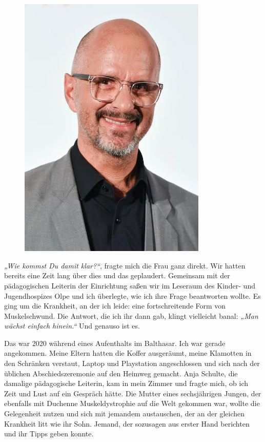 \documentclass[fontsize=14pt,a4paper,headinclude,DIV=calc,automark]{scrbook}
\begin{document}
\begin{figure}[ht] %
    \centering %
    \includegraphics[width=0.8\textwidth]{Fotos/ChristophMariaHerbst.jpg}
    \label{fig:ChristophMariaHerbst} %
\end{figure}

\vspace{-1\baselineskip}

\textit{„Wie kommst Du damit klar?“}, fragte mich die Frau ganz direkt. Wir hatten bereits eine Zeit lang über dies und das geplaudert. Gemeinsam mit der pädagogischen Leiterin der Einrichtung saßen wir im Leseraum des Kinder- und Jugendhospizes Olpe und ich überlegte, wie ich ihre Frage beantworten wollte. Es ging um die Krankheit, an der ich leide: eine fortschreitende Form von Muskelschwund. Die Antwort, die ich ihr dann gab, klingt vielleicht banal: \textit{„Man wächst einfach hinein.“} Und genauso ist es.

Das war 2020 während eines Aufenthalts im Balthasar. Ich war gerade angekommen. Meine Eltern hatten die Koffer ausgeräumt, meine Klamotten in den Schränken verstaut, Laptop und Playstation angeschlossen und sich nach der üblichen Abschiedszeremonie auf den Heimweg gemacht. Anja Schulte, die damalige pädagogische Leiterin, kam in mein Zimmer und fragte mich, ob ich Zeit und Lust auf ein Gespräch hätte. Die Mutter eines sechsjährigen Jungen, der ebenfalls mit Duchenne Muskeldystrophie auf die Welt gekommen war, wollte die Gelegenheit nutzen und sich mit jemandem austauschen, der an der gleichen Krankheit litt wie ihr Sohn. Jemand, der sozusagen aus erster Hand berichten und ihr Tipps geben konnte.
\end{document}
